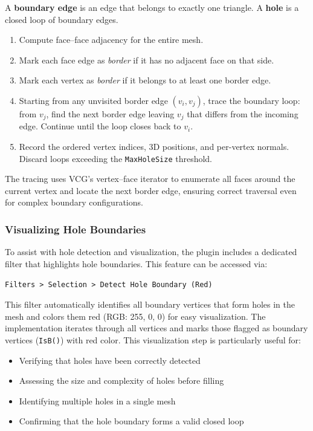 \documentclass[12pt,a4paper]{article}
\begin{document}
A \textbf{boundary edge} is an edge that belongs to exactly one triangle. A \textbf{hole} is a closed loop of boundary edges.

\begin{enumerate}[leftmargin=2em]
  \item Compute face--face adjacency for the entire mesh.
  \item Mark each face edge as \emph{border} if it has no adjacent face on that side.
  \item Mark each vertex as \emph{border} if it belongs to at least one border edge.
  \item Starting from any unvisited border edge $(v_i, v_j)$, trace the boundary loop: from $v_j$, find the next border edge leaving $v_j$ that differs from the incoming edge. Continue until the loop closes back to $v_i$.
  \item Record the ordered vertex indices, 3D positions, and per-vertex normals. Discard loops exceeding the \texttt{MaxHoleSize} threshold.
\end{enumerate}

The tracing uses VCG's vertex--face iterator to enumerate all faces around the current vertex and locate the next border edge, ensuring correct traversal even for complex boundary configurations.

\subsubsection{Visualizing Hole Boundaries}

To assist with hole detection and visualization, the plugin includes a dedicated filter that highlights hole boundaries. This feature can be accessed via:

\begin{center}
\texttt{Filters > Selection > Detect Hole Boundary (Red)}
\end{center}

This filter automatically identifies all boundary vertices that form holes in the mesh and colors them red (RGB: 255, 0, 0) for easy visualization. The implementation iterates through all vertices and marks those flagged as boundary vertices (\texttt{IsB()}) with red color. This visualization step is particularly useful for:

\begin{itemize}[leftmargin=2em]
  \item Verifying that holes have been correctly detected
  \item Assessing the size and complexity of holes before filling
  \item Identifying multiple holes in a single mesh
  \item Confirming that the hole boundary forms a valid closed loop
\end{itemize}
\end{document}

